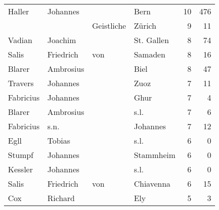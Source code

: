 \begin{center}
\begin{tiny}
\begin{longtabu}{llllrr}
                   Haller &                           Johannes &             &                                        Bern &         10 &       476 \\
                          &                                    &  Geistliche &                                      Zürich &          9 &        11 \\
                   Vadian &                            Joachim &             &                                  St. Gallen &          8 &        74 \\
                    Salis &                          Friedrich &         von &                                     Samaden &          8 &        16 \\
                   Blarer &                          Ambrosius &             &                                        Biel &          8 &        47 \\
                  Travers &                           Johannes &             &                                        Zuoz &          7 &        11 \\
                Fabricius &                           Johannes &             &                                        Ghur &          7 &         4 \\
                   Blarer &                          Ambrosius &             &                                        s.l. &          7 &         6 \\
                Fabricius &                               s.n. &             &                                    Johannes &          7 &        12 \\
                     Egll &                             Tobias &             &                                        s.l. &          6 &         0 \\
                   Stumpf &                           Johannes &             &                                   Stammheim &          6 &         0 \\
                  Kessler &                           Johannes &             &                                        s.l. &          6 &         0 \\
                    Salis &                          Friedrich &         von &                                   Chiavenna &          6 &        15 \\
                      Cox &                            Richard &             &                                         Ely &          5 &         3 \\

\end{longtabu}
\end{tiny}
\end{center}
